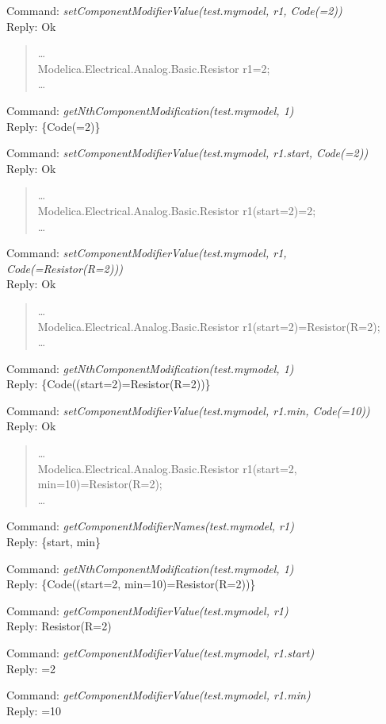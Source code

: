 \documentclass[11pt,a4paper,oneside,english]{book}
\newenvironment{modelicaExamples}{\begin{itemize}}{\end{itemize}}
\newcommand{\command}[1]{Command: \textit{#1}\\}
\newcommand{\reply}[1]{Reply: #1}
\newcommand{\functionex}[2]{\begin{singlespace} \command{#1} \reply{#2} \end{singlespace}}
\newenvironment{mocode}{\begin{verse}\begin{singlespace}\begin{scriptsize}\ttfamily}{\end{scriptsize}\end{singlespace}\end{verse}}
\begin{document}
\begin{modelicaExamples}
			\functionex{setComponentModifierValue(test.mymodel, r1, Code(=2))}
			{Ok}

			\begin{mocode}
			\dots \\
			Modelica.Electrical.Analog.Basic.Resistor r1=2;\\
			\dots \\
			\end{mocode}
			\functionex{getNthComponentModification(test.mymodel, 1)}
			{\{Code(=2)\}}

			\functionex{setComponentModifierValue(test.mymodel, r1.start, Code(=2))}
			{Ok}

			\begin{mocode}
			\dots \\
			Modelica.Electrical.Analog.Basic.Resistor r1(start=2)=2;\\
			\dots \\
			\end{mocode}
			\functionex{setComponentModifierValue(test.mymodel, r1, Code(=Resistor(R=2)))}
			{Ok}

			\begin{mocode}
			\dots \\
			Modelica.Electrical.Analog.Basic.Resistor r1(start=2)=Resistor(R=2);\\
			\dots \\
			\end{mocode}
			\functionex{getNthComponentModification(test.mymodel, 1)}
			{\{Code((start=2)=Resistor(R=2))\}}

			\functionex{setComponentModifierValue(test.mymodel, r1.min, Code(=10))}
			{Ok}

			\begin{mocode}
			\dots \\
			Modelica.Electrical.Analog.Basic.Resistor r1(start=2, min=10)=Resistor(R=2);\\
			\dots \\
			\end{mocode}
			\functionex{getComponentModifierNames(test.mymodel, r1)}
			{\{start, min\}}

			\functionex{getNthComponentModification(test.mymodel, 1)}
			{\{Code((start=2, min=10)=Resistor(R=2))\}}

			\functionex{getComponentModifierValue(test.mymodel, r1)}
			{Resistor(R=2)}

			\functionex{getComponentModifierValue(test.mymodel, r1.start)}
			{=2}

			\functionex{getComponentModifierValue(test.mymodel, r1.min)}
			{=10}


\end{modelicaExamples}
\end{document}

